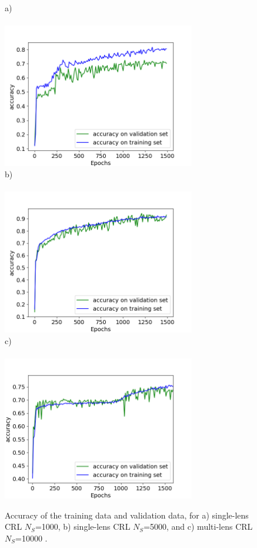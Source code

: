 \documentclass{iucr}
\begin{document}
\begin{figure}\label{fig:v12v13}
    a)~~~~~~~~~~~~~~~~~~~~~~~~~~~~~~~~~~~~~~~~~~~~~~~~~~~~~~~~~~~\\    \includegraphics[width=0.75\textwidth]{figures/v12.png}
    b)~~~~~~~~~~~~~~~~~~~~~~~~~~~~~~~~~~~~~~~~~~~~~~~~~~~~~~~~~~~\\ \includegraphics[width=0.75\textwidth]{figures/v13.png}
    c)~~~~~~~~~~~~~~~~~~~~~~~~~~~~~~~~~~~~~~~~~~~~~~~~~~~~~~~~~~~\\ \includegraphics[width=0.75\textwidth]{figures/v25.png}
    \caption{Accuracy of the training data and validation data, for a) single-lens CRL $N_S$=1000, b) single-lens CRL $N_S$=5000, and c) multi-lens CRL $N_S$=10000 .
    }
\end{figure}
\end{document}
